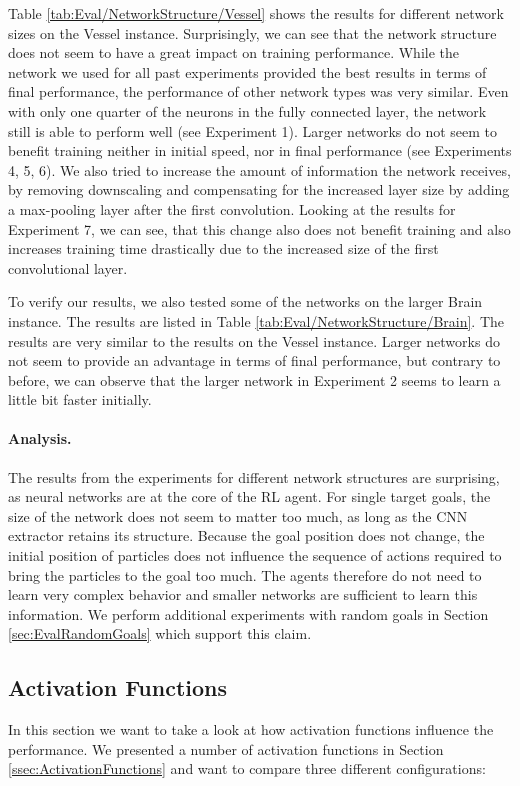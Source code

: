 Table \ref{tab:Eval/NetworkStructure/Vessel} shows the results for different network sizes on the Vessel instance. Surprisingly, we can see that the network structure does not seem to have a great impact on training performance. While the network we used for all past experiments provided the best results in terms of final performance, the performance of other network types was very similar. Even with only one quarter of the neurons in the fully connected layer, the network still is able to perform well (see Experiment 1). Larger networks do not seem to benefit training neither in initial speed, nor in final performance (see Experiments 4, 5, 6). We also tried to increase the amount of information the network receives, by removing downscaling and compensating for the increased layer size by adding a max-pooling layer after the first convolution. Looking at the results for Experiment 7, we can see, that this change also does not benefit training and also increases training time drastically due to the increased size of the first convolutional layer. 

To verify our results, we also tested some of the networks on the larger Brain instance. The results are listed in Table \ref{tab:Eval/NetworkStructure/Brain}. The results are very similar to the results on the Vessel instance. Larger networks do not seem to provide an advantage in terms of final performance, but contrary to before, we can observe that the larger network in Experiment 2 seems to learn a little bit faster initially. 

\paragraph{Analysis. } The results from the experiments for different network structures are surprising, as neural networks are at the core of the RL agent. For single target goals, the size of the network does not seem to matter too much, as long as the CNN extractor retains its structure. Because the goal position does not change, the initial position of particles does not influence the sequence of actions required to bring the particles to the goal too much. The agents therefore do not need to learn very complex behavior and smaller networks are sufficient to learn this information. We perform additional experiments with random goals in Section \ref{sec:EvalRandomGoals} which support this claim.

\subsection{Activation Functions} \label{sec:Eval/ActivationFunctions}
In this section we want to take a look at how activation functions influence the performance. We presented a number of activation functions in Section \ref{ssec:ActivationFunctions} and want to compare three different configurations: 

